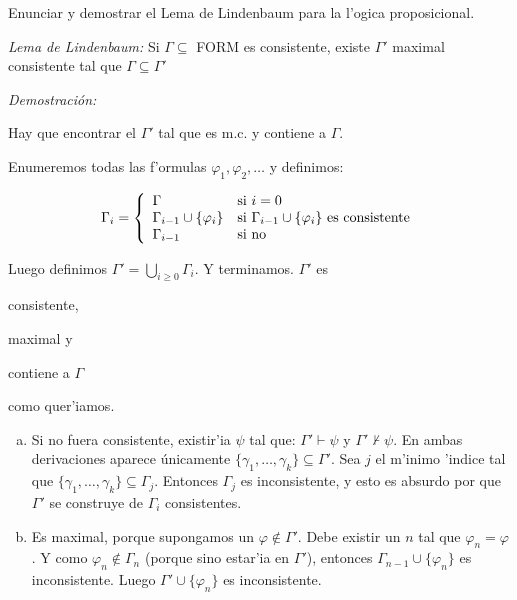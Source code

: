 \begin{questions}
\begin{solution}
\end{solution}


\question Enunciar y demostrar el Lema de Lindenbaum para la l'ogica proposicional.
\begin{solution}

{\it Lema de Lindenbaum:} Si $\Gamma \subseteq$ FORM es consistente, existe $\Gamma'$ maximal consistente tal que $\Gamma \subseteq \Gamma'$

{\it Demostraci\'on: }

Hay que encontrar el $\Gamma'$ tal que es m.c. y contiene a $\Gamma$. 

Enumeremos todas las f'ormulas $\varphi_1, \varphi_2, \dots$ y definimos: 

$$\Gamma_i = \left\{
  \begin{array}{l l}
  \Gamma 				& \text{si } i = 0 \\
  \Gamma_{i-1} \cup \{ \varphi_i \} 	& \text{si } \Gamma_{i-1} \cup \{ \varphi_i \} \text{ es consistente} \\ 
  \Gamma_{i-1} 				& \text{si no} 
  \end{array}
  \right.
  $$

Luego definimos $\Gamma' = \bigcup_{i\geq 0} \Gamma_i$. Y terminamos. $\Gamma'$ es \begin{inparaenum}[(a)] \item consistente, \item maximal y \item contiene a $\Gamma$ \end{inparaenum} como quer'iamos.

\begin{enumerate}[(a)]
 \item Si no fuera consistente, existir'ia $\psi$ tal que: $\Gamma' \vdash \psi$ y $\Gamma' \nvdash \psi$. En ambas derivaciones aparece \'unicamente $\{ \gamma_1, \dots, \gamma_k \} \subseteq \Gamma'$. Sea $j$ el m'inimo 'indice tal que $\{ \gamma_1, \dots, \gamma_k \} \subseteq \Gamma_j$. Entonces $\Gamma_j$ es inconsistente, y esto es absurdo por que $\Gamma'$ se construye de $\Gamma_i$ consistentes. 
 
 \item Es maximal, porque supongamos un $\varphi \notin \Gamma'$. Debe existir un $n$ tal que $\varphi_n = \varphi$. Y como $\varphi_n \notin \Gamma_n$ (porque sino estar'ia en $\Gamma'$), entonces $\Gamma_{n-1} \cup \{ \varphi_n \}$ es inconsistente. Luego $\Gamma' \cup \{ \varphi_n \}$ es inconsistente. 
\end{enumerate}


\end{solution}
\end{questions}
